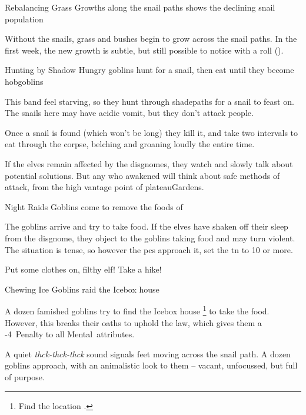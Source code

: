 \begin{multicols}{2}
%

{Rebalancing Grass}%
{Growths along the snail paths shows the declining snail population}%

Without the snails, grass and bushes begin to grow across the snail paths.
In the first week, the new growth is subtle, but still possible to notice with a  roll (\tn[12]).

{Hunting by Shadow}%
{Hungry goblins hunt for a snail, then eat until they become hobgoblins}%

This band feel starving, so they hunt through \gls{shadepaths} for a snail to feast on.
The snails here may have acidic vomit, but they don't attack people.

Once a snail is found (which won't be long) they kill it, and take two \glspl{interval} to eat through the corpse, belching and groaning loudly the entire time.

If the elves remain affected by the \glspl{disgnome}, they watch and slowly talk about potential solutions.
But any who awakened will think about safe methods of attack, from the high vantage point of \gls{plateauGardens}.

{Night Raids}%
{Goblins come to remove the foods of }%

The goblins arrive and try to take food.
If the elves have shaken off their sleep from the \gls{disgnome}, they object to the goblins taking food and may turn violent.
The situation is tense, so however the \glspl{pc} approach it, set the \gls{tn} to 10 or more.


\begin{boxtext}
  Put some clothes on, filthy elf!
  Take a hike!
\end{boxtext}

{Chewing Ice}%
{Goblins raid the Icebox house}%

A dozen famished goblins try to find the Icebox house%
\footnote{Find the location .}
to take the food.
However, this breaks their oaths to uphold the law, which gives them a -4~Penalty to all Mental~\glspl{attribute}.

\begin{boxtext}
  A quiet \textit{thck-thck-thck} sound signals feet moving across the snail path.
  A dozen goblins approach, with an animalistic look to them -- vacant, unfocussed, but full of purpose.
\end{boxtext}


\end{multicols}
